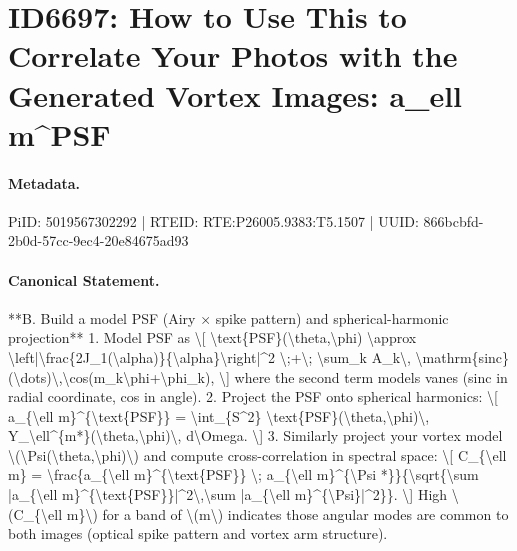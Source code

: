 \section*{ID6697: How to Use This to Correlate Your Photos with the Generated Vortex Images: a\_ell m\textasciicircum{}PSF}
\paragraph{Metadata.}
PiID: 5019567302292 | RTEID: RTE:P26005.9383:T5.1507 | UUID: 866bcbfd-2b0d-57cc-9ec4-20e84675ad93

\paragraph{Canonical Statement.}
**B. Build a model PSF (Airy × spike pattern) and spherical-harmonic projection** 1. Model PSF as \textbackslash{}[ \textbackslash{}text\{PSF\}(\textbackslash{}theta,\textbackslash{}phi) \textbackslash{}approx \textbackslash{}left|\textbackslash{}frac\{2J\_1(\textbackslash{}alpha)\}\{\textbackslash{}alpha\}\textbackslash{}right|\textasciicircum{}2 \textbackslash{};+\textbackslash{}; \textbackslash{}sum\_k A\_k\textbackslash{}, \textbackslash{}mathrm\{sinc\}(\textbackslash{}dots)\textbackslash{},\textbackslash{}cos(m\_k\textbackslash{}phi+\textbackslash{}phi\_k), \textbackslash{}] where the second term models vanes (sinc in radial coordinate, cos in angle). 2. Project the PSF onto spherical harmonics: \textbackslash{}[ a\_\{\textbackslash{}ell m\}\textasciicircum{}\{\textbackslash{}text\{PSF\}\} = \textbackslash{}int\_\{S\textasciicircum{}2\} \textbackslash{}text\{PSF\}(\textbackslash{}theta,\textbackslash{}phi)\textbackslash{}, Y\_\textbackslash{}ell\textasciicircum{}\{m*\}(\textbackslash{}theta,\textbackslash{}phi)\textbackslash{}, d\textbackslash{}Omega. \textbackslash{}] 3. Similarly project your vortex model \textbackslash{}(\textbackslash{}Psi(\textbackslash{}theta,\textbackslash{}phi)\textbackslash{}) and compute cross-correlation in spectral space: \textbackslash{}[ C\_\{\textbackslash{}ell m\} = \textbackslash{}frac\{a\_\{\textbackslash{}ell m\}\textasciicircum{}\{\textbackslash{}text\{PSF\}\} \textbackslash{}; a\_\{\textbackslash{}ell m\}\textasciicircum{}\{\textbackslash{}Psi *\}\}\{\textbackslash{}sqrt\{\textbackslash{}sum |a\_\{\textbackslash{}ell m\}\textasciicircum{}\{\textbackslash{}text\{PSF\}\}|\textasciicircum{}2\textbackslash{},\textbackslash{}sum |a\_\{\textbackslash{}ell m\}\textasciicircum{}\{\textbackslash{}Psi\}|\textasciicircum{}2\}\}. \textbackslash{}] High \textbackslash{}(C\_\{\textbackslash{}ell m\}\textbackslash{}) for a band of \textbackslash{}(m\textbackslash{}) indicates those angular modes are common to both images (optical spike pattern and vortex arm structure).

